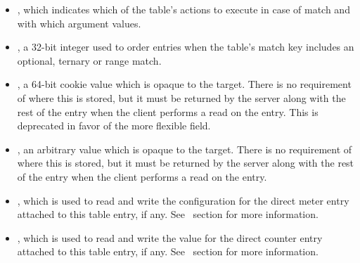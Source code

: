 \documentclass[11pt]{article}
\begin{document}
{\begin{itemize}
\item{}
, which indicates which of the table's actions to execute in case of
match and with which argument values.%

\item{}
, a 32-bit integer used to order entries when the table's match key
includes an optional, ternary or range match.%

\item{}
, a 64-bit cookie value which is opaque to the
target. There is no requirement of where this is stored, but it must be
returned by the server along with the rest of the entry when the client
performs a read on the entry. This is deprecated in favor of the more flexible
 field.%

\item{}
, an arbitrary  value which is opaque to the
target. There is no requirement of where this is stored, but it must be
returned by the server along with the rest of the entry when the client
performs a read on the entry.%

\item{}
, which is used to read and write the configuration for the
direct meter entry attached to this table entry, if any. See~ section for more information.%

\item{}
, which is used to read and write the value for the direct
counter entry attached to this table entry, if any. See~ section for more information.%


\end{itemize}}
\end{document}
